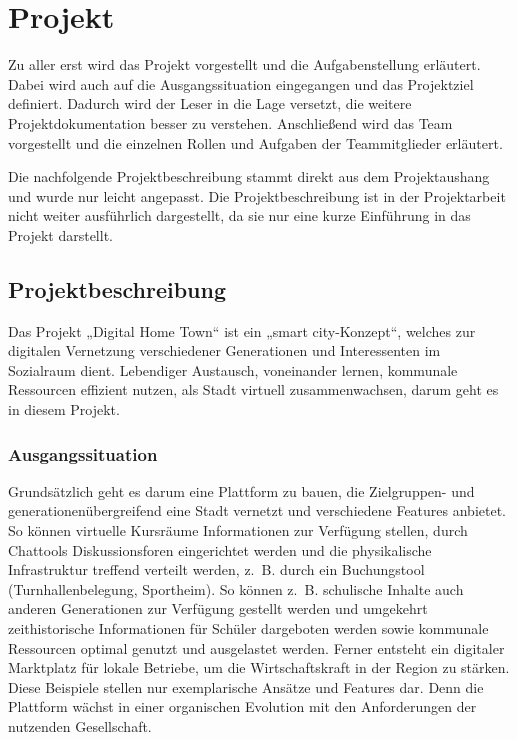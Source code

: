 \chapter{Projekt}
\label{ch:project}

Zu aller erst wird das Projekt vorgestellt und die Aufgabenstellung erläutert. Dabei wird auch auf die Ausgangssituation eingegangen und das Projektziel definiert.
Dadurch wird der Leser in die Lage versetzt, die weitere Projektdokumentation besser zu verstehen.
Anschließend wird das Team vorgestellt und die einzelnen Rollen und Aufgaben der Teammitglieder erläutert.

Die nachfolgende Projektbeschreibung stammt direkt aus dem Projektaushang und wurde nur leicht angepasst. Die Projektbeschreibung ist in der Projektarbeit nicht weiter ausführlich dargestellt, da sie nur eine kurze Einführung in das Projekt darstellt.

\section{Projektbeschreibung}
\label{sec:project-description}

Das Projekt „Digital Home Town“ ist ein „smart city-Konzept“, welches zur digitalen
Vernetzung verschiedener Generationen und Interessenten im Sozialraum dient. Lebendiger
Austausch, voneinander lernen, kommunale Ressourcen effizient nutzen, als Stadt virtuell
zusammenwachsen, darum geht es in diesem Projekt.

\subsection{Ausgangssituation}
\label{sub:project-start}

Grundsätzlich geht es darum eine Plattform zu bauen, die Zielgruppen- und generationenübergreifend eine Stadt vernetzt und verschiedene Features anbietet.
So können virtuelle Kursräume Informationen zur Verfügung stellen, durch Chattools Diskussionsforen eingerichtet werden und die physikalische Infrastruktur treffend verteilt werden, z. B. durch ein Buchungstool (Turnhallenbelegung, Sportheim).
So können z. B. schulische Inhalte auch anderen Generationen zur Verfügung gestellt werden und umgekehrt zeithistorische Informationen für Schüler dargeboten werden sowie kommunale Ressourcen optimal genutzt und ausgelastet werden.
Ferner entsteht ein digitaler Marktplatz für lokale Betriebe, um die Wirtschaftskraft in der Region zu stärken.
Diese Beispiele stellen nur exemplarische Ansätze und Features dar.
Denn die Plattform wächst in einer organischen Evolution mit den Anforderungen der nutzenden Gesellschaft.

